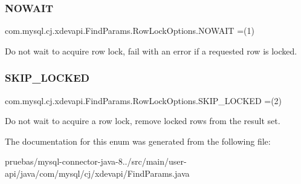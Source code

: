 \subsubsection{\texorpdfstring{N\+O\+W\+A\+IT}{NOWAIT}}
{\footnotesize\ttfamily com.\+mysql.\+cj.\+xdevapi.\+Find\+Params.\+Row\+Lock\+Options.\+N\+O\+W\+A\+IT =(1)}

Do not wait to acquire row lock, fail with an error if a requested row is locked. \mbox{\label{enumcom_1_1mysql_1_1cj_1_1xdevapi_1_1_find_params_1_1_row_lock_options_ae0b500686e79e2bd8cfa2b94e2bf557e}} 
\subsubsection{\texorpdfstring{S\+K\+I\+P\+\_\+\+L\+O\+C\+K\+ED}{SKIP\_LOCKED}}
{\footnotesize\ttfamily com.\+mysql.\+cj.\+xdevapi.\+Find\+Params.\+Row\+Lock\+Options.\+S\+K\+I\+P\+\_\+\+L\+O\+C\+K\+ED =(2)}

Do not wait to acquire a row lock, remove locked rows from the result set. 

The documentation for this enum was generated from the following file\+:\begin{DoxyCompactItemize}
\item 
pruebas/mysql-\/connector-\/java-\/8../src/main/user-\/api/java/com/mysql/cj/xdevapi/Find\+Params.\+java\end{DoxyCompactItemize}
